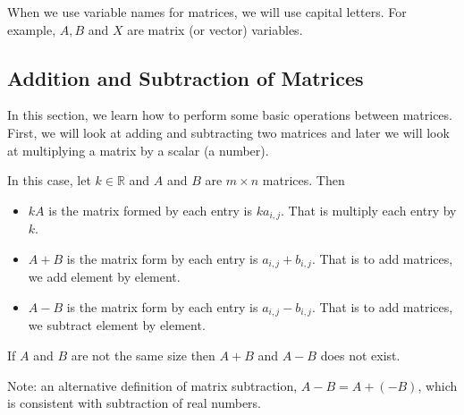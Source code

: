 When we use variable names for matrices, we will use capital letters.  For example, $A, B$ and $X$ are matrix (or vector) variables.  

\subsection{Addition and Subtraction of Matrices}


In this section, we learn how to perform some basic operations between matrices.  First, we will look at adding and subtracting two matrices and later we will look at multiplying a matrix by a scalar (a number).  

\begin{definition}
In this case, let $k \in \mathbb{R}$ and $A$ and $B$ are $m \times n$ matrices.  Then 

\begin{itemize}
\item $kA$ is the matrix formed by each entry is $ka_{i,j}$.  That is multiply each entry by $k$. 
\item $A+B$ is the matrix form by each entry is $a_{i,j}+b_{i,j}$.  That is to add matrices, we add element by element. 
\item $A-B$ is the matrix form by each entry is $a_{i,j}-b_{i,j}$.  That is to add matrices, we subtract element by element. 
\end{itemize}
If $A$ and $B$ are not the same size then $A+B$ and $A-B$ does not exist.  
\end{definition}

Note: an alternative definition of matrix subtraction, $A-B=A+(-B)$, which is consistent with subtraction of real numbers.  

